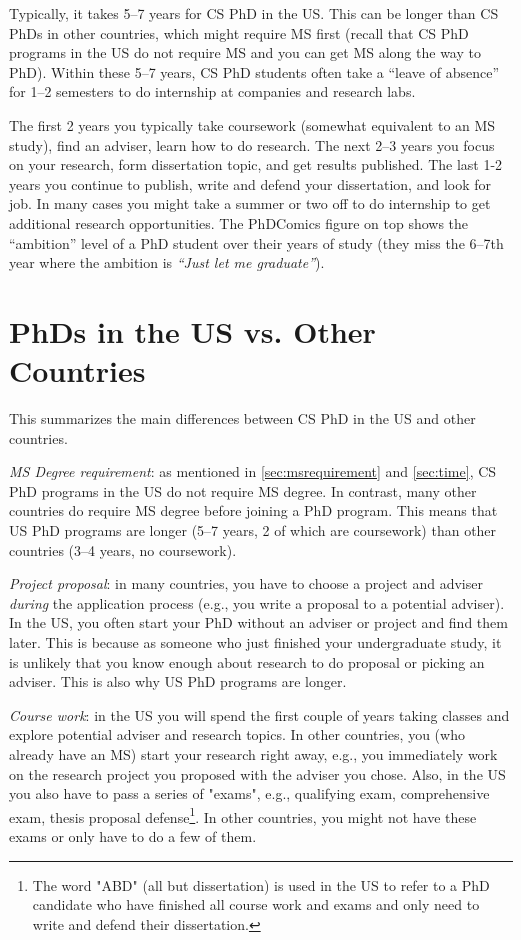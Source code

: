 \documentclass[oneside,11pt,dvipsnames]{book}
\begin{document}
Typically, it takes 5--7 years for CS PhD in the US.  This can be longer than CS PhDs in other countries, which might require MS first (recall that CS PhD programs in the US do not require MS and you can get MS along the way to PhD). Within these 5--7 years, CS PhD students often take a ``leave of absence'' for 1--2 semesters to do internship at companies and research labs.

The first 2 years you typically take coursework (somewhat equivalent to an MS study), find an adviser, learn how to do research.  The next 2--3 years you focus on your research, form dissertation topic, and get results published. The last 1-2 years you continue to publish, write and defend your dissertation, and look for job.
In many cases you might take a summer or two off to do internship to get additional research opportunities.
The PhDComics figure on top shows the ``ambition'' level of a PhD student over their years of study (they miss the 6--7th year where the ambition is \emph{``Just let me graduate''}).


\section{PhDs in the US vs. Other Countries}\label{sec:non-us-differences}

This summarizes the main differences between CS PhD in the US and other countries. %

\emph{MS Degree requirement}:  as mentioned in \autoref{sec:msrequirement} and \autoref{sec:time}, CS PhD programs in the US do not require MS degree.  In contrast, many other countries do require MS degree before joining a PhD program.  This means that US PhD programs are longer (5--7 years, 2 of which are coursework) than other countries (3--4 years, no coursework).

\emph{Project proposal}: in many countries, you have to choose a project and adviser \emph{during} the application process (e.g., you write a proposal to a potential adviser). In the US, you often start your PhD without an adviser or project and find them later. This is because as someone who just finished your undergraduate study, it is unlikely that you know enough about research to do proposal or picking an adviser.  This is also why US PhD programs are longer.

\emph{Course work}: in the US you will spend the first couple of years taking classes and explore potential adviser and research topics. In other countries, you (who already have an MS) start your research right away, e.g., you immediately work on the research project you proposed with the adviser you chose. Also, in the US you also have to pass a series of "exams", e.g., qualifying exam, comprehensive exam, thesis proposal defense\footnote{The word "ABD" (all but dissertation) is used in the US to refer to a PhD candidate who have finished all course work and exams and only need to write and defend their dissertation.}. In other countries, you might not have these exams or only have to do a few of them.
\end{document}
